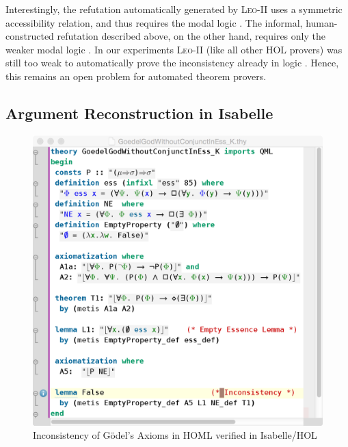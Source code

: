 \documentclass{article}
\begin{document}
Interestingly, the refutation automatically generated by
\textsc{Leo-II} uses a symmetric accessibility relation, and thus
requires the modal logic \KB. The informal, human-constructed
refutation described above, on the other hand, requires only the
weaker modal logic \K. In our experiments \textsc{Leo-II} (like all
other HOL provers) was still too weak to automatically prove the
inconsistency already in logic \K. Hence, this remains an open problem for automated
theorem provers.


\subsection{Argument Reconstruction in Isabelle}  \label{sec:arg2}
\begin{figure}[t]
\centerline{\includegraphics[width=1\columnwidth]{./Images/InconsistencyIsabelleK.png}}
\caption{Inconsistency of G\"odel's Axioms in HOML \K verified in Isabelle/HOL} \label{InconsistencyIsabelleK}
\end{figure}
\end{document}
